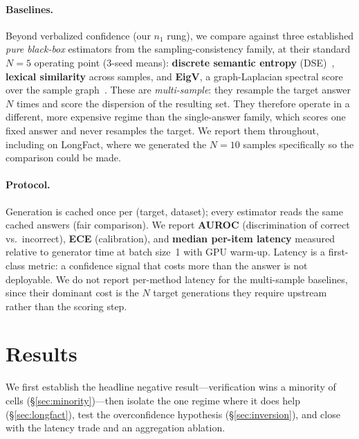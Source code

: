 \documentclass[11pt]{article}
\begin{document}
\paragraph{Baselines.} Beyond verbalized confidence (our $n_1$ rung), we compare against
three established \emph{pure black-box} estimators from the sampling-consistency family,
at their standard $N{=}5$ operating point (3-seed means): \textbf{discrete semantic
entropy} (DSE)~\citep{kuhn2023semantic}, \textbf{lexical similarity} across
samples, and \textbf{EigV}, a graph-Laplacian spectral score over the sample
graph~\citep{lin2024generating}. These are \emph{multi-sample}: they resample the target
answer $N$ times and score the dispersion of the resulting set. They therefore operate in
a different, more expensive regime than the single-answer family, which scores one fixed answer
and never resamples the target. We report them throughout, including on LongFact, where we
generated the $N{=}10$ samples specifically so the comparison could be made.

\paragraph{Protocol.} Generation is cached once per (target, dataset); every estimator
reads the same cached answers (fair comparison). We report \textbf{AUROC} (discrimination
of correct vs.\ incorrect), \textbf{ECE} (calibration), and \textbf{median per-item
latency} measured relative to generator time at batch size~1 with GPU warm-up. Latency is
a first-class metric: a confidence signal that costs more than the answer is not
deployable. We do not report per-method latency for the multi-sample baselines, since their
dominant cost is the $N$ target generations they require upstream rather than the scoring step.

\section{Results}\label{sec:results}
We first establish the headline negative result---verification wins a minority of cells
(\S\ref{sec:minority})---then isolate the one regime where it does help
(\S\ref{sec:longfact}), test the overconfidence hypothesis (\S\ref{sec:inversion}), and close
with the latency trade and an aggregation ablation.
\end{document}
